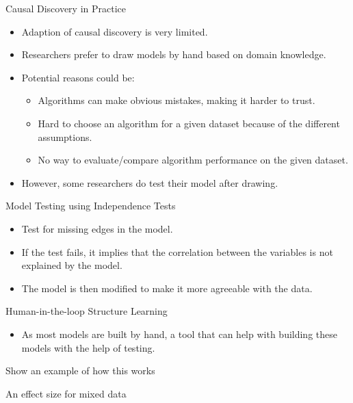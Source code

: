 \documentclass{beamer}
\begin{document}
\begin{frame}{Causal Discovery in Practice}
	\begin{itemize}
		\item Adaption of causal discovery is very limited.
		\item Researchers prefer to draw models by hand based on domain knowledge.
		\item Potential reasons could be:
			\begin{itemize}
				\item Algorithms can make obvious mistakes, making it harder to trust.
				\item Hard to choose an algorithm for a given dataset because of the different assumptions.
				\item No way to evaluate/compare algorithm performance on the given dataset.
			\end{itemize}
		\item However, some researchers do test their model after drawing.
	\end{itemize}
\end{frame}

\begin{frame}{Model Testing using Independence Tests}

	\begin{itemize}
		\item Test for missing edges in the model.
		\item If the test fails, it implies that the correlation between the variables is not explained by the model.
		\item The model is then modified to make it more agreeable with the data.
	\end{itemize}
\end{frame}

\begin{frame}{Human-in-the-loop Structure Learning}
	\begin{itemize}
		\item As most models are built by hand, a tool that can help with building these models with the help of testing.
	\end{itemize}
\end{frame}

\begin{frame}{Show an example of how this works}
\end{frame}

\begin{frame}{An effect size for mixed data}
\end{frame}
\end{document}
